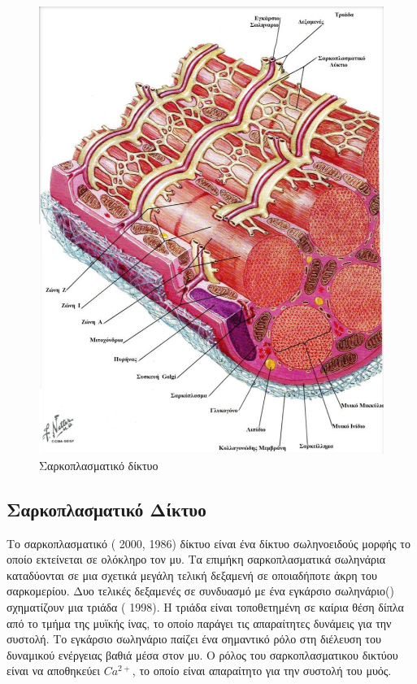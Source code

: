 \begin{figure}[H]
    \centering
    \includegraphics[width=.7\textwidth, height=0.6\textheight]{neuromusculoskeletal/fig/muscle-fysiology3.png}
    \caption{Σαρκοπλασματικό δίκτυο\protect\footnotemark}
    \label{fig:muscle-fysiology3}
\end{figure}

\subsection{Σαρκοπλασματικό Δίκτυο}

Το σαρκοπλασματικό ( 2000,  1986) δίκτυο είναι ένα δίκτυο σωληνοειδούς μορφής το οποίο εκτείνεται σε ολόκληρο τον μυ. Τα επιμήκη σαρκοπλασματικά σωληνάρια καταδύονται σε μια σχετικά μεγάλη τελική δεξαμενή σε οποιαδήποτε άκρη του σαρκομερίου. Δυο τελικές δεξαμενές σε συνδυασμό με ένα εγκάρσιο σωληνάριο() σχηματίζουν μια τριάδα ( 1998). Η τριάδα είναι τοποθετημένη σε καίρια θέση δίπλα από το τμήμα της μυϊκής ίνας, το οποίο παράγει τις απαραίτητες δυνάμεις για την συστολή. Το εγκάρσιο σωληνάριο παίζει ένα σημαντικό ρόλο στη διέλευση του δυναμικού ενέργειας βαθιά μέσα στον μυ. Ο ρόλος του σαρκοπλασματικου δικτύου είναι να αποθηκεύει $Ca^{2+}$, το οποίο είναι απαραίτητο για την συστολή του μυός.

